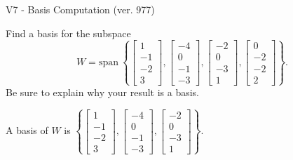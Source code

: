 \begin{exercise}
  \begin{exerciseTitle}V7 - Basis Computation (ver. 977)\end{exerciseTitle}
  \begin{exerciseStatement}
    Find a basis for the subspace 
\[W=\mathrm{span}\ \left\{\left[\begin{array}{r}
1 \\
-1 \\
-2 \\
3
\end{array}\right] , \left[\begin{array}{r}
-4 \\
0 \\
-1 \\
-3
\end{array}\right] , \left[\begin{array}{r}
-2 \\
0 \\
-3 \\
1
\end{array}\right] , \left[\begin{array}{r}
0 \\
-2 \\
-2 \\
2
\end{array}\right]\right\}.\]
 Be sure to explain why your result is a basis.


  \end{exerciseStatement}
  \begin{exerciseAnswer}
   A basis of \(W\) is  \(\left\{\left[\begin{array}{r}
1 \\
-1 \\
-2 \\
3
\end{array}\right] , \left[\begin{array}{r}
-4 \\
0 \\
-1 \\
-3
\end{array}\right] , \left[\begin{array}{r}
-2 \\
0 \\
-3 \\
1
\end{array}\right]\right\}\).
  


  \end{exerciseAnswer}
\end{exercise}